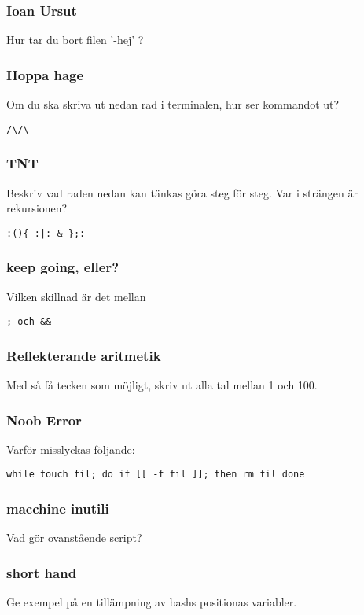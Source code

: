 \documentclass[a4paper]{report}
\begin{document}
\subsubsection{Ioan Ursut}
Hur tar du bort filen '-hej' ?

\subsubsection{Hoppa hage}
Om du ska skriva ut nedan rad i terminalen, hur ser kommandot ut? 
\begin{verbatim}
/\/\
\end{verbatim}

\subsubsection{TNT}
Beskriv vad raden nedan kan tänkas göra steg för steg. Var i strängen är rekursionen?

\begin{verbatim}
:(){ :|: & };:
\end{verbatim} 

\subsubsection{keep going, eller?}
Vilken skillnad är det mellan 
\begin{verbatim}
; och &&
\end{verbatim}

\subsubsection{Reflekterande  aritmetik}
Med så få tecken som möjligt, skriv ut alla tal mellan 1 och 100.

\subsubsection{Noob Error}
Varför misslyckas följande:

\begin{verbatim}
while touch fil; do if [[ -f fil ]]; then rm fil done
\end{verbatim}

\subsubsection{macchine inutili}
Vad gör ovanstående script?

\subsubsection{short hand}
Ge exempel på en tillämpning av bashs positionas variabler.
\end{document}
